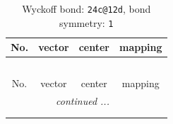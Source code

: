 \documentclass[fleqn,8pt]{jsarticle}
\begin{document}
\renewcommand{\arraystretch}{1.2}
\begin{longtable}{cccc}
\caption{Wyckoff bond: {\tt 24c@12d}, bond symmetry: {\tt 1}}
 \\
 \hline \hline
No. & vector & center & mapping \\ \hline \endfirsthead

\multicolumn{3}{l}{\tablename\ \thetable{}} \\
 \hline \hline
No. & vector & center & mapping \\ \hline \endhead

 \hline \hline
\multicolumn{3}{r}{\footnotesize\it continued ...} \\ \endfoot

 \hline \hline
\multicolumn{3}{r}{} \\ \endlastfoot


\end{longtable}
\end{document}

